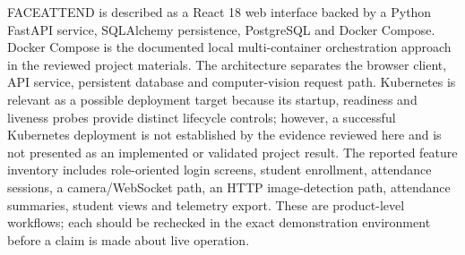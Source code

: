 \documentclass[11pt,a4paper]{article}
\begin{document}
FACEATTEND is described as a React 18 web interface backed by a Python FastAPI service, SQLAlchemy persistence, PostgreSQL and Docker Compose. Docker Compose is the documented local multi-container orchestration approach in the reviewed project materials. The architecture separates the browser client, API service, persistent database and computer-vision request path. Kubernetes is relevant as a possible deployment target because its startup, readiness and liveness probes provide distinct lifecycle controls; however, a successful Kubernetes deployment is not established by the evidence reviewed here and is not presented as an implemented or validated project result. The reported feature inventory includes role-oriented login screens, student enrollment, attendance sessions, a camera/WebSocket path, an HTTP image-detection path, attendance summaries, student views and telemetry export. These are product-level workflows; each should be rechecked in the exact demonstration environment before a claim is made about live operation.
\end{document}
